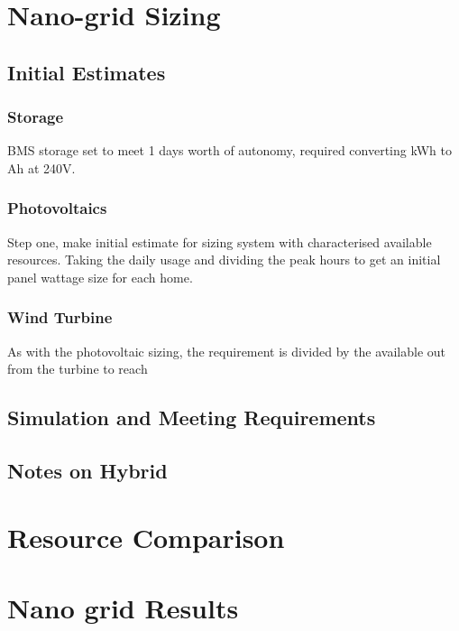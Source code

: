 \documentclass[journal]{IEEEtran}
\begin{document}
\section{Nano-grid Sizing}
        \subsection{Initial Estimates}
                \subsubsection*{Storage}
                BMS storage set to meet 1 days worth of autonomy, required converting kWh to Ah at 240V.

                \subsubsection*{Photovoltaics}
                Step one, make initial estimate for sizing system with characterised available resources. Taking the daily usage and dividing the peak hours to get an initial panel wattage size for each home. 
                
                

                \subsubsection*{Wind Turbine}
                As with the photovoltaic sizing, the requirement is divided by the available out from the turbine to reach
                
                

        
        \subsection{Simulation and Meeting Requirements}
        

        \subsection{Notes on Hybrid}

\section{Resource Comparison}

\section{Nano grid Results}
\end{document}
